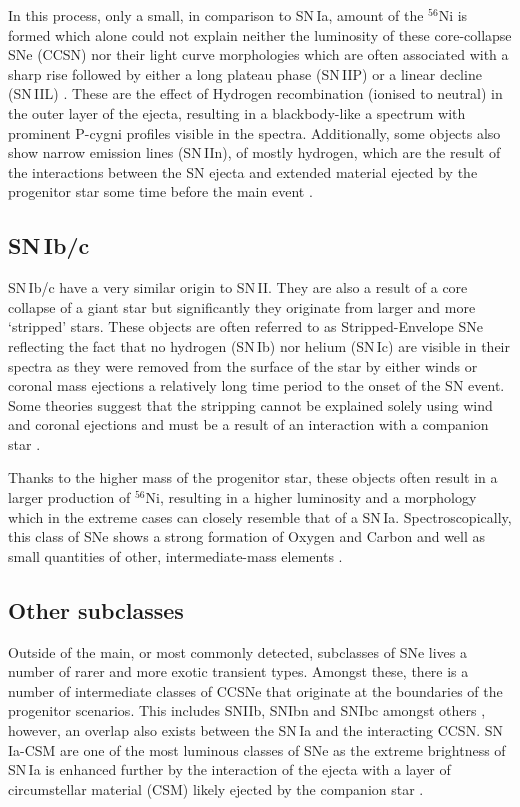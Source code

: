In this process, only a small, in comparison to SN\,Ia, amount of the $^{56}$Ni is formed which alone could not explain neither the luminosity of these core-collapse SNe (CCSN) nor their light curve morphologies which are often associated with a sharp rise followed by either a long plateau phase (SN\,IIP) or a linear decline (SN\,IIL) \citep{Alsabti2017}. These are the effect of Hydrogen recombination (ionised to neutral) in the outer layer of the ejecta, resulting in a blackbody-like a spectrum with prominent P-cygni profiles visible in the spectra. Additionally, some objects also show narrow emission lines (SN\,IIn), of mostly hydrogen, which are the result of the interactions between the SN ejecta and extended material ejected by the progenitor star some time before the main event \citep{Pastorello2002,Sternberg2011}.

\subsection{SN\,Ib/c}
SN\,Ib/c have a very similar origin to SN\,II. They are also a result of a core collapse of a giant star but significantly they originate from larger and more `stripped' stars. These objects are often referred to as Stripped-Envelope SNe reflecting the fact that no hydrogen (SN\,Ib) nor helium (SN\,Ic) are visible in their spectra as they were removed from the surface of the star by either winds or coronal mass ejections a relatively long time period to the onset of the SN event. Some theories suggest that the stripping cannot be explained solely using wind and coronal ejections and must be a result of an interaction with a companion star \citep{Tauris2013}.

Thanks to the higher mass of the progenitor star, these objects often result in a larger production of $^{56}$Ni, resulting in a higher luminosity and a morphology which in the extreme cases can closely resemble that of a SN\,Ia. Spectroscopically, this class of SNe shows a strong formation of Oxygen and Carbon and well as small quantities of other, intermediate-mass elements \citep{Filippenko1997}.

\subsection{Other subclasses}
Outside of the main, or most commonly detected, subclasses of SNe lives a number of rarer and more exotic transient types. Amongst these, there is a number of intermediate classes of CCSNe that originate at the boundaries of the progenitor scenarios. This includes SNIIb, SNIbn and SNIbc amongst others \citep{Alsabti2017}, however, an overlap also exists between the SN\,Ia and the interacting CCSN. SN\,Ia-CSM are one of the most luminous classes of SNe as the extreme brightness of SN\,Ia is enhanced further by the interaction of the ejecta with a layer of circumstellar material (CSM) likely ejected by the companion star \citep{Dilday2012}.

